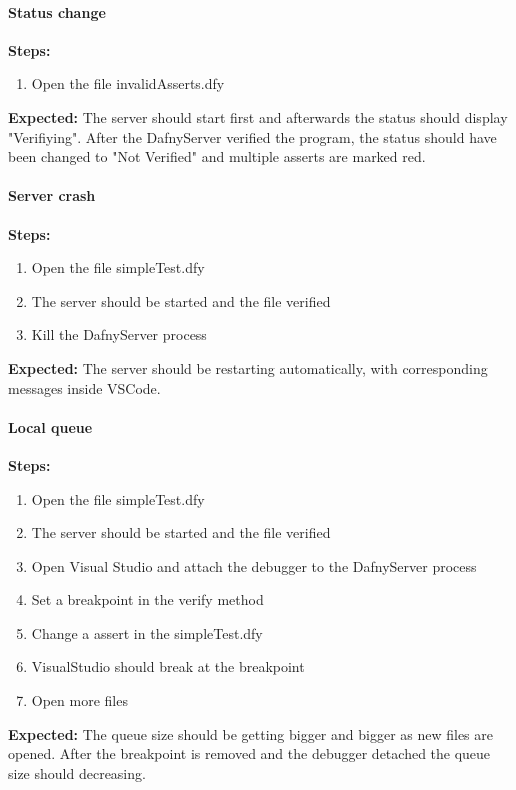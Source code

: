 \paragraph{Status change}
\textbf{\newline Steps:}
\begin{enumerate}
	\item Open the file invalidAsserts.dfy

\end{enumerate}
\textbf{\newline Expected:}
The server should start first and afterwards the status should display "Verifiying". After the DafnyServer verified the program, the status should have been changed to "Not Verified" and multiple asserts are marked red. 

\paragraph{Server crash}
\textbf{\newline Steps:}
\begin{enumerate}
	\item Open the file simpleTest.dfy
	\item The server should be started and the file verified
	\item Kill the DafnyServer process
\end{enumerate}
\textbf{\newline Expected:}
The server should be restarting automatically, with corresponding messages inside VSCode. 


\paragraph{Local queue}
\textbf{\newline Steps:}
\begin{enumerate}
	\item Open the file simpleTest.dfy
	\item The server should be started and the file verified
	\item Open Visual Studio and attach the debugger to the DafnyServer process
	\item Set a breakpoint in the verify method
	\item Change a assert in the simpleTest.dfy 
	\item VisualStudio should break at the breakpoint
	\item Open more files
\end{enumerate}
\textbf{\newline Expected:}
The queue size should be getting bigger and bigger as new files are opened. After the breakpoint is removed and the debugger detached the queue size should decreasing. 

